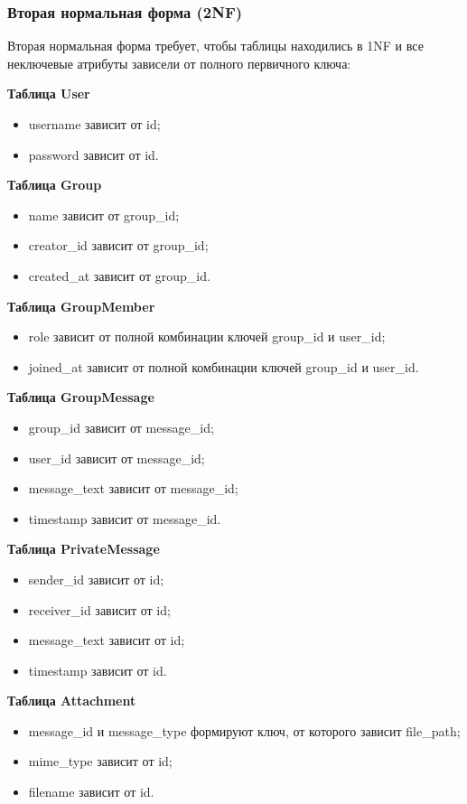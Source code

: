 \subsubsection{Вторая нормальная форма (2NF)}

Вторая нормальная форма требует, чтобы таблицы находились в 1NF и все неключевые атрибуты зависели от полного первичного ключа:

\textbf{Таблица User}  
\begin{itemize}
	\item username зависит от id;
	\item password зависит от id.
\end{itemize}

\textbf{Таблица Group}  
\begin{itemize}
	\item name зависит от group\_id;
	\item creator\_id зависит от group\_id;
	\item created\_at зависит от group\_id.
\end{itemize}

\textbf{Таблица GroupMember}  
\begin{itemize}
	\item role зависит от полной комбинации ключей group\_id и user\_id;
	\item joined\_at зависит от полной комбинации ключей group\_id и user\_id.
\end{itemize}

\textbf{Таблица GroupMessage}  
\begin{itemize}
	\item group\_id зависит от message\_id;
	\item user\_id зависит от message\_id;
	\item message\_text зависит от message\_id;
	\item timestamp зависит от message\_id.
\end{itemize}

\textbf{Таблица PrivateMessage}  
\begin{itemize}
	\item sender\_id зависит от id;
	\item receiver\_id зависит от id;
	\item message\_text зависит от id;
	\item timestamp зависит от id.
\end{itemize}

\textbf{Таблица Attachment}  
\begin{itemize}
	\item message\_id и message\_type формируют ключ, от которого зависит file\_path;
	\item mime\_type зависит от id;
	\item filename зависит от id.
\end{itemize}

